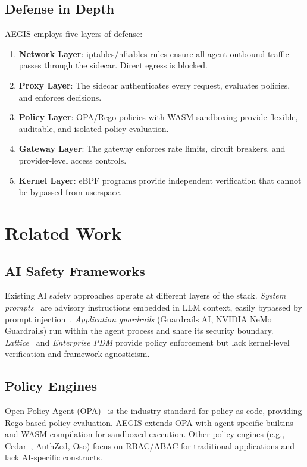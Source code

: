 \documentclass[runningheads]{llncs}
\begin{document}
\subsection{Defense in Depth}

AEGIS employs five layers of defense:

\begin{enumerate}
\item \textbf{Network Layer}: iptables/nftables rules ensure all agent outbound traffic passes through the sidecar. Direct egress is blocked.
\item \textbf{Proxy Layer}: The sidecar authenticates every request, evaluates policies, and enforces decisions.
\item \textbf{Policy Layer}: OPA/Rego policies with WASM sandboxing provide flexible, auditable, and isolated policy evaluation.
\item \textbf{Gateway Layer}: The gateway enforces rate limits, circuit breakers, and provider-level access controls.
\item \textbf{Kernel Layer}: eBPF programs provide independent verification that cannot be bypassed from userspace.
\end{enumerate}

\section{Related Work}

\subsection{AI Safety Frameworks}

Existing AI safety approaches operate at different layers of the stack. \emph{System prompts}~\cite{openaiSafety} are advisory instructions embedded in LLM context, easily bypassed by prompt injection~\cite{promptInjection2023,willison2023}. \emph{Application guardrails} (Guardrails AI, NVIDIA NeMo Guardrails) run within the agent process and share its security boundary. \emph{Lattice}~\cite{lattice2025} and \emph{Enterprise PDM} provide policy enforcement but lack kernel-level verification and framework agnosticism.

\subsection{Policy Engines}

Open Policy Agent (OPA)~\cite{opa2024} is the industry standard for policy-as-code, providing Rego-based policy evaluation. AEGIS extends OPA with agent-specific builtins and WASM compilation for sandboxed execution. Other policy engines (e.g., Cedar~\cite{cedar2023}, AuthZed, Oso) focus on RBAC/ABAC for traditional applications and lack AI-specific constructs.
\end{document}
